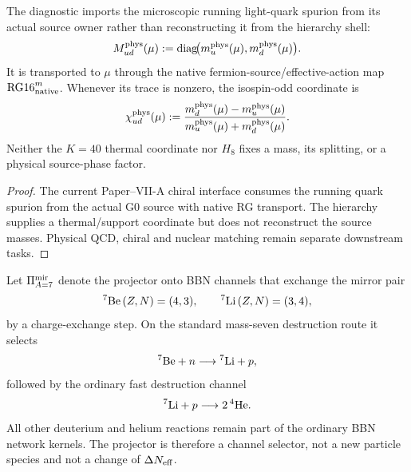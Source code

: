 \documentclass[12pt,a4paper]{article}
\begin{document}
\begin{lemma}[Local \(\Ksh=40\) light-spurion handoff]
\label{p9:lem:local-k40-spurion-import}
The diagnostic imports the microscopic running light-quark spurion from its
actual source owner rather than reconstructing it from the hierarchy shell:
\begin{equation}
\label{p9:eq:local-k40-spurion-package}
 M_{ud}^{\rm phys}(\mu)
 :=\operatorname{diag}\!\bigl(m_u^{\rm phys}(\mu),m_d^{\rm phys}(\mu)\bigr).
\end{equation}
It is transported to \(\mu\) through the native
fermion-source/effective-action map $\mathrm{RG16}^{m}_{\rm native}$.
Whenever its trace is nonzero, the isospin-odd coordinate is
\begin{equation}
\label{p9:eq:local-k40-trace-split}
 \chi_{ud}^{\rm phys}(\mu)
 :=\frac{m_d^{\rm phys}(\mu)-m_u^{\rm phys}(\mu)}
         {m_u^{\rm phys}(\mu)+m_d^{\rm phys}(\mu)} .
\end{equation}
Neither the \(K=40\) thermal coordinate nor \(H_8\) fixes a mass, its
splitting, or a physical source-phase factor.
\end{lemma}

\begin{proof}
The current Paper--VII-A chiral interface consumes the running quark spurion
from the actual G0 source with native RG transport.  The hierarchy supplies
a thermal/support coordinate but does not reconstruct the source masses.
Physical QCD, chiral and nuclear matching remain separate downstream tasks.
\end{proof}

\begin{definition}
\label{p9:def:mass-seven-mirror-projector}
Let \(\Pi_{A=7}^{\rm mir}\) denote the projector onto BBN channels that exchange
the mirror pair
\[
  {}^7{\rm Be}\,(Z,N)=(4,3),
  \qquad
  {}^7{\rm Li}\,(Z,N)=(3,4),
\]
by a charge-exchange step.  On the standard mass-seven destruction route it
selects
\begin{equation}
\label{p9:eq:be7-np-channel}
  {}^7{\rm Be}+n\longrightarrow{}^7{\rm Li}+p,
\end{equation}
followed by the ordinary fast destruction channel
\begin{equation}
\label{p9:eq:li7-pa-channel}
  {}^7{\rm Li}+p\longrightarrow 2\,{}^4{\rm He}.
\end{equation}
All other deuterium and helium reactions remain part of the ordinary BBN
network kernels.  The projector is therefore a channel selector, not a new
particle species and not a change of \(\Delta N_{\rm eff}\).
\end{definition}
\end{document}

